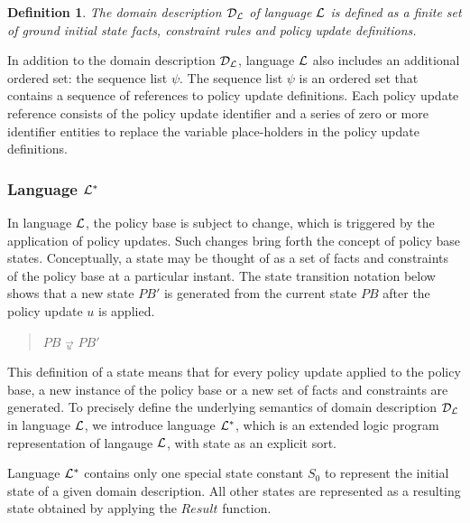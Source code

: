 \documentclass[10pt, twocolumn]{article}
\newtheorem{definition}{Definition}
\begin{document}
        \begin{definition}
          The domain description ${\cal D}_{\cal L}$ of language ${\cal L}$ is
          defined as a finite set of ground initial state facts, constraint
          rules and policy update definitions.
        \end{definition}

        In addition to the domain description ${\cal D}_{\cal L}$, language
        ${\cal L}$ also includes an additional ordered set: the sequence list
        $\psi$. The sequence list $\psi$ is an ordered set that contains a
        sequence of references to policy update definitions. Each policy update
        reference consists of the policy update identifier and a series of zero
        or more identifier entities to replace the variable place-holders in
        the policy update definitions.

      \subsubsection{Language ${\cal L}^{*}$}

        In language ${\cal L}$, the policy base is subject to change, which is
        triggered by the application of policy updates. Such changes bring
        forth the concept of policy base states. Conceptually, a state may be
        thought of as a set of facts and constraints of the policy base at a
        particular instant. The state transition notation below shows that a
        new state $PB'$ is generated from the current state $PB$ after the
        policy update $u$ is applied.

        \begin{quote}
          $PB$ $\overrightarrow{_{u}}$ $PB'$
        \end{quote}

        This definition of a state means that for every policy update applied
        to the policy base, a new instance of the policy base or a new set of
        facts and constraints are generated. To precisely define the underlying
        semantics of domain description ${\cal D}_{\cal L}$ in language
        ${\cal L}$, we introduce language ${\cal L}^{*}$, which is an extended
        logic program representation of langauge ${\cal L}$, with state as an
        explicit sort.

        Language ${\cal L}^{*}$ contains only one special state constant
        $S_{0}$ to represent the initial state of a given domain description.
        All other states are represented as a resulting state obtained by
        applying the $Result$ function.
\end{document}
